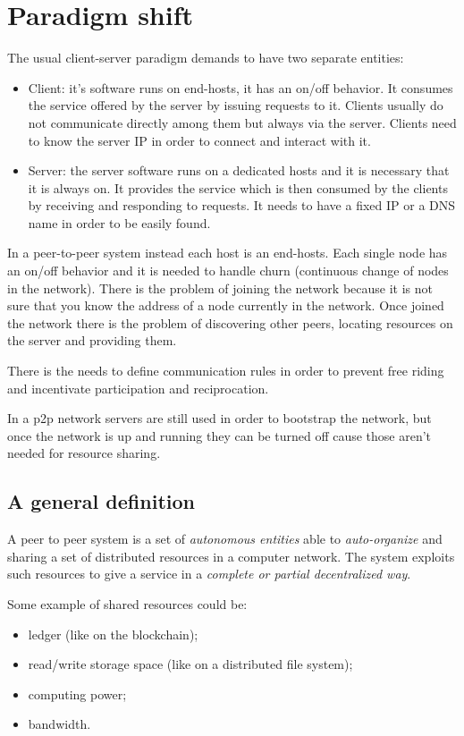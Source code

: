 \section{Paradigm shift}

The usual client-server paradigm demands to have two separate entities:
\begin{itemize}
    \item Client: it's software runs on end-hosts, it has an on/off behavior.
    It consumes the service offered by the server by issuing requests to it.
    Clients usually do not communicate directly among them but always via the server.
    Clients need to know the server IP in order to connect and interact with it.

    \item Server: the server software runs on a dedicated hosts and it is necessary that it is always on.
    It provides the service which is then consumed by the clients by receiving and responding to requests.
    It needs to have a fixed IP or a DNS name in order to be easily found.
\end{itemize}

In a peer-to-peer system instead each host is an end-hosts.
Each single node has an on/off behavior and it is needed to handle churn (continuous change of nodes in the network).
There is the problem of joining the network because it is not sure that you know the address of a node currently in the network.
Once joined the network there is the problem of discovering other peers, locating resources on the server and providing them.

There is the needs to define communication rules in order to prevent free riding and incentivate participation and reciprocation.

In a p2p network servers are still used in order to bootstrap the network, but once the network is up and running they can be turned off cause those aren't needed for resource sharing.

\subsection{A general definition}
A peer to peer system is a set of \emph{autonomous entities} able to \emph{auto-organize} and sharing a set of distributed resources in a computer network.
The system exploits such resources to give a service in a \emph{complete or partial decentralized way}.

Some example of shared resources could be:
\begin{itemize}
    \item ledger (like on the blockchain);
    \item read/write storage space (like on a distributed file system);
    \item computing power;
    \item bandwidth.
\end{itemize}

